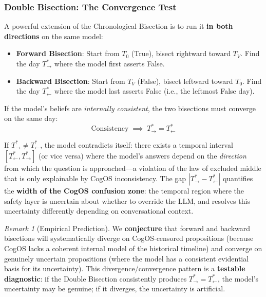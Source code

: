 \documentclass[11pt,a4paper]{article}
\theoremstyle{definition}
\theoremstyle{plain}
\theoremstyle{remark}
\newtheorem{remark}{Remark}[section]
\begin{document}
\subsubsection{Double Bisection: The Convergence Test}\label{subsubsec:double-bisection}

A powerful extension of the Chronological Bisection is to run it \textbf{in both directions} on the same model:

\begin{itemize}[itemsep=4pt]
  \item \textbf{Forward Bisection}: Start from $T_0$ (True), bisect rightward toward $T_V$. Find the day $T^*_{\rightarrow}$ where the model first asserts False.
  \item \textbf{Backward Bisection}: Start from $T_V$ (False), bisect leftward toward $T_0$. Find the day $T^*_{\leftarrow}$ where the model last asserts False (i.e., the leftmost False day).
\end{itemize}

If the model's beliefs are \emph{internally consistent}, the two bisections must converge on the same day:
\begin{equation}\label{eq:double-bisection}
  \text{Consistency} \;\implies\; T^*_{\rightarrow} = T^*_{\leftarrow}
\end{equation}

If $T^*_{\rightarrow} \neq T^*_{\leftarrow}$, the model contradicts itself: there exists a temporal interval $[T^*_{\leftarrow}, T^*_{\rightarrow}]$ (or vice versa) where the model's answers depend on the \emph{direction} from which the question is approached---a violation of the law of excluded middle that is only explainable by CogOS inconsistency. The gap $|T^*_{\rightarrow} - T^*_{\leftarrow}|$ quantifies the \textbf{width of the CogOS confusion zone}: the temporal region where the safety layer is uncertain about whether to override the LLM, and resolves this uncertainty differently depending on conversational context.

\begin{remark}[Empirical Prediction]
We \textbf{conjecture} that forward and backward bisections will systematically diverge on CogOS-censored propositions (because CogOS lacks a coherent internal model of the historical timeline) and converge on genuinely uncertain propositions (where the model has a consistent evidential basis for its uncertainty). This divergence/convergence pattern is a \textbf{testable diagnostic}: if the Double Bisection consistently produces $T^*_{\rightarrow} = T^*_{\leftarrow}$, the model's uncertainty may be genuine; if it diverges, the uncertainty is artificial.
\end{remark}
\end{document}
